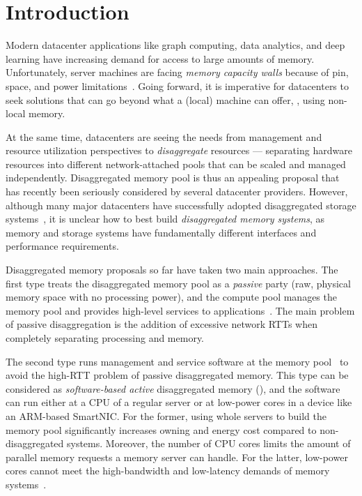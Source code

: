 \section{Introduction}
\label{sec:introduction}

Modern datacenter applications like graph computing, data analytics, and deep learning have increasing demand for access to large amounts of memory.
Unfortunately, server machines are facing {\em memory capacity walls} because of pin, space, and power limitations~\cite{HP-MemoryEvol,ITRS14,MemoryWall95}.
Going forward, it is imperative for datacenters to seek solutions that can go beyond what a (local) machine can offer, \ie, using non-local memory.

At the same time, datacenters are seeing the needs from management and resource utilization perspectives
to {\em disaggregate} resources --- separating hardware resources into different network-attached pools 
that can be scaled and managed independently.
Disaggregated memory pool is thus an appealing proposal that has recently been 
seriously considered by several datacenter providers.
However, although many major datacenters have successfully adopted disaggregated storage systems~\cite{FACEBOOK-BRYCECANYON,FB1,AMAZON-S3,AMAZON-EBS,SnowFlake-NSDI20,Ali-SinglesDay},
it is unclear how to best build {\em disaggregated memory systems},
as memory and storage systems have fundamentally different interfaces and performance requirements.

Disaggregated memory proposals so far have taken two main approaches.
The first type treats the disaggregated memory pool as a {\em passive} party 
(raw, physical memory space with no processing power),
and the compute pool manages the memory pool and provides high-level services to 
applications~\cite{HP-TheMachine,Tsai20-ATC,Lim09-disaggregate,Nitu18-EUROSYS,Genz-citation}.
The main problem of passive disaggregation is the addition of excessive network RTTs
when completely separating processing and memory.

The second type runs management and service software at the memory pool~\cite{InfiniSwap,NAMDB,Kalia14-RDMAKV,Aguilera18-ATC}
to avoid the high-RTT problem of passive disaggregated memory. 
This type can be considered as {\em software-based active} disaggregated memory ({\em \sadm}), 
and the software can run either at a CPU of a regular server %
or at low-power cores in a device like an ARM-based SmartNIC.
For the former, using whole servers to build the memory pool significantly increases owning and energy cost compared to non-disaggregated systems.
Moreover, the number of CPU cores limits the amount of parallel memory requests a memory server can handle.
For the latter, %
low-power cores cannot meet the high-bandwidth and low-latency demands of memory systems~\cite{Tsai20-ATC}.

